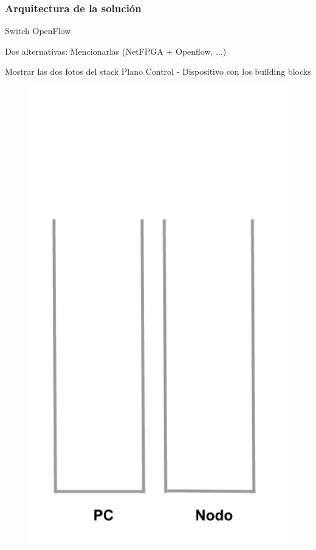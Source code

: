 \documentclass{beamer}
\begin{document}
\begin{frame}
\frametitle{Arquitectura de la soluci\'on} 

\begin{minipage}{0.60\textwidth}
Switch OpenFlow

Dos alternativas: Mencionarlas (NetFPGA + Openflow, ...)

Mostrar las dos fotos del stack Plano Control - Dispositivo con los building blocks

\end{minipage}
\hfill
\begin{minipage}{0.30\textwidth}
\begin{figure}[H]
\raggedright
\includegraphics[width=1.0\textwidth, right]{imagenes/Stack.png}
\end{figure}
\end{minipage} 


\end{frame}
\end{document}
